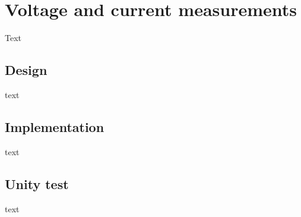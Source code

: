 \section{Voltage and current measurements}
\label{sec:measurements}
Text

\subsection{Design}
text

\subsection{Implementation}
text

\subsection{Unity test}
text